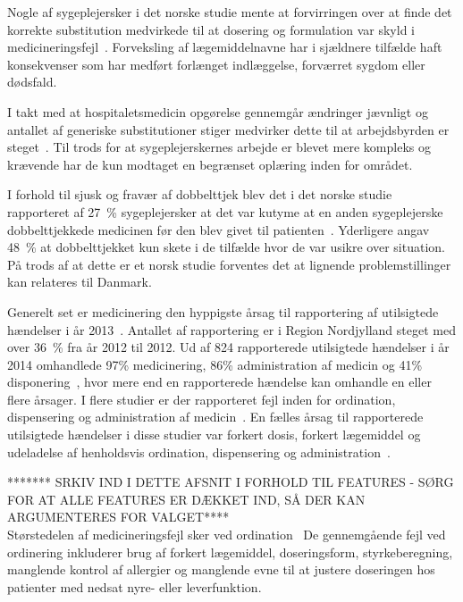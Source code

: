 Nogle af sygeplejersker i det norske studie mente at forvirringen over at finde det korrekte substitution medvirkede til at dosering og formulation var skyld i medicineringsfejl~\citep{Hakonsen2010}. Forveksling af lægemiddelnavne har i sjældnere tilfælde haft konsekvenser som har medført forlænget indlæggelse, forværret sygdom eller dødsfald.~\citep{DanskSelskabforPatientsikkerhed2009}

I takt med at hospitaletsmedicin opgørelse gennemgår ændringer jævnligt og antallet af generiske substitutioner stiger medvirker dette til at arbejdsbyrden er steget~\citep{Hakonsen2010}. Til trods for at sygeplejerskernes arbejde er blevet mere kompleks og krævende har de kun modtaget en begrænset oplæring inden for området.~\citep{Hakonsen2010}

I forhold til sjusk og fravær af dobbelttjek blev det i det norske studie rapporteret af 27~\% sygeplejersker at det var kutyme at en anden sygeplejerske dobbelttjekkede medicinen før den blev givet til patienten~\citep{Hakonsen2010}. Yderligere angav 48~\% at dobbelttjekket kun skete i de tilfælde hvor de var usikre over situation.~\citep{Hakonsen2010} På trods af at dette er et norsk studie forventes det at lignende problemstillinger kan relateres til Danmark.

Generelt set er medicinering den hyppigste årsag til rapportering af utilsigtede hændelser i år 2013~\citep{Patientombuddet2013}. Antallet af rapportering er i Region Nordjylland steget med over 36~\% fra år 2012 til 2012. Ud af 824 rapporterede utilsigtede hændelser i år 2014 omhandlede 97\% medicinering, 86\% administration af medicin og 41\% disponering~\citep{Jensen2014}, hvor mere end en rapporterede hændelse kan omhandle en eller flere årsager. I flere studier er der rapporteret fejl inden for ordination, dispensering og administration af medicin~\citep{Barker2002,Sundhedsstyrelsen2005, Lisby2005, Tully2009}. En fælles årsag til rapporterede utilsigtede hændelser i disse studier var forkert dosis, forkert lægemiddel og udeladelse af henholdsvis ordination, dispensering og administration~\citep{Barker2002,Sundhedsstyrelsen2005,Lisby2005, Tully2009}.

******* SRKIV IND I DETTE AFSNIT I FORHOLD TIL FEATURES - SØRG FOR AT ALLE FEATURES ER DÆKKET IND, SÅ DER KAN ARGUMENTERES FOR VALGET**** \\
Størstedelen af medicineringsfejl sker ved ordination~\citep{Agrawal2009,Anderson2002,Kaushal2002}
De gennemgående fejl ved ordinering inkluderer brug af forkert lægemiddel, doseringsform, styrkeberegning, manglende kontrol af allergier og manglende evne til at justere doseringen hos patienter med nedsat nyre- eller leverfunktion.~\citep{Agrawal2009}


